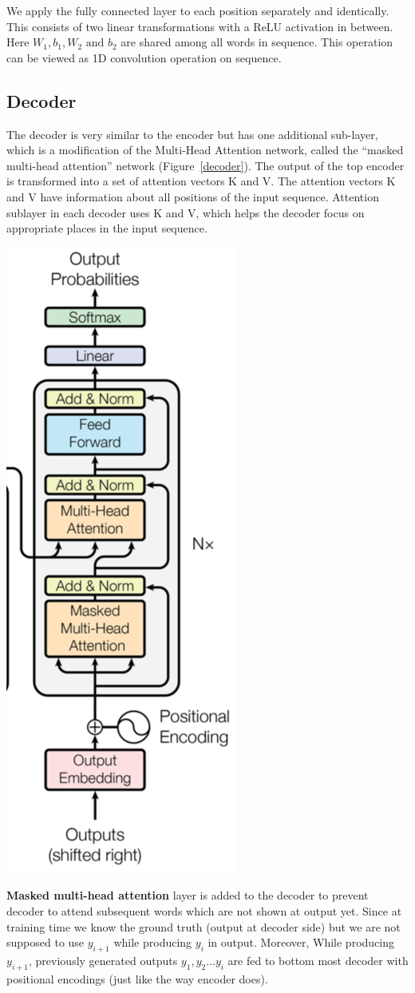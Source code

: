 \documentclass{article}
\begin{document}
\begin{multicols}{2}
\noindent We apply the fully connected layer to each position separately and identically. This consists of two linear transformations with a ReLU activation in between.\\


\noindent Here $W_1, b_1,W_2 \text{ and } b_2$  are shared among all words in sequence. This operation can be viewed as 1D convolution operation on sequence.

\subsection{Decoder}

The decoder is very similar to the encoder but has one additional sub-layer, which is a modification of the Multi-Head Attention network, called the “masked multi-head attention” network  (Figure~\ref{decoder}). 
The output of the top encoder is transformed into a set of attention vectors K and V. The attention vectors K and V have information about all positions of the input sequence. Attention sublayer in each decoder uses K and V, which helps the decoder focus on appropriate places in the input sequence. 
\begin{center}
        \captionsetup{type=figure}
        \includegraphics[height=.65\textwidth , width=.40\textwidth]{decoder.png}
        \label{decoder}
\end{center}


\noindent \textbf{Masked multi-head attention} layer is added to the decoder to prevent decoder to attend subsequent words which are not shown at output yet. Since at training time we know the ground truth (output at decoder side) but we are not supposed to use $y_{i+1}$ while producing $y_i$ in output. Moreover, While producing $y_{i+1}$, previously generated outputs $y_1, y_2 \dots y_i$ are fed to bottom most decoder with positional encodings (just like the way encoder does).

\end{multicols}
\end{document}
